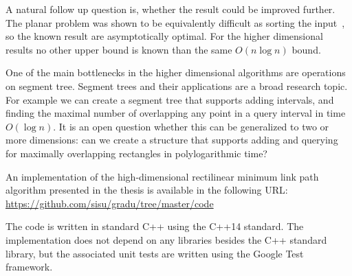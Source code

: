 \documentclass[english,gradu]{tktltiki2018}
\begin{document}
A natural follow up question is, whether the result could be improved further.
The planar problem was shown to be equivalently difficult as sorting the input~\cite{dasnar}, so the known result are asymptotically optimal.
For the higher dimensional results no other upper bound is known than the same $O(n\log n)$ bound.

One of the main bottlenecks in the higher dimensional algorithms are operations on segment tree.
Segment trees and their applications are a broad research topic.
For example we can create a segment tree that supports adding intervals, and finding the maximal number of overlapping any point in a query interval in time $O(\log n)$.
It is an open question whether this can be generalized to two or more dimensions: can we create a structure that supports adding and querying for maximally overlapping rectangles in polylogarithmic time?


\nocite{*}



\lastpage

\appendices

\pagestyle{empty}


An implementation of the high-dimensional rectilinear minimum link path algorithm presented in the thesis is available in the following URL: \\
\url{https://github.com/sisu/gradu/tree/master/code}

The code is written in standard C++ using the C++14 standard.
The implementation does not depend on any libraries besides the C++ standard library, but the associated unit tests are written using the Google Test framework.
\end{document}
